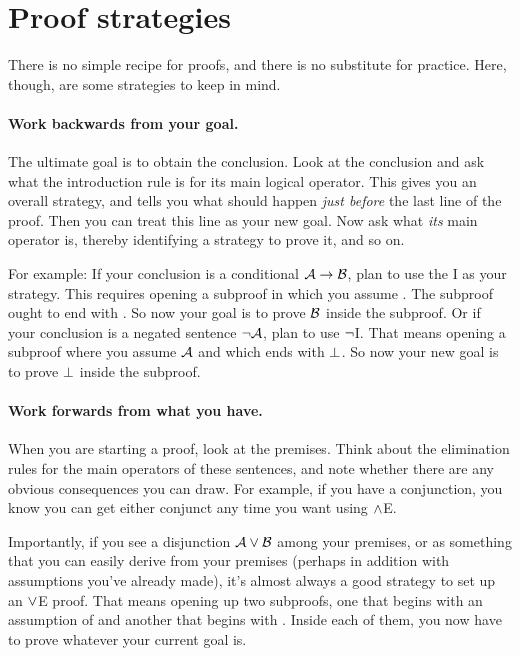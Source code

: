 \section{Proof strategies}\label{s:ProofStrategies}
There is no simple recipe for proofs, and there is no substitute for practice. Here, though, are some strategies to keep in mind.

\paragraph{Work backwards from your goal.}
The ultimate goal is to obtain the conclusion. Look at the conclusion and ask what the introduction rule is for its main logical operator. This gives you an overall strategy, and tells you what should happen \emph{just before} the last line of the proof. Then you can treat this line as your new goal. Now ask what \emph{its} main operator is, thereby identifying a strategy to prove it, and so on.


For example: If your conclusion is a conditional $\mathcal{A}\rightarrow\mathcal{B}$, plan to use the {\eif}I as your strategy. This requires opening a subproof in which you assume . The subproof ought to end with . So now your goal is to prove $\mathcal{B}$ inside the subproof.  Or if your conclusion is a negated sentence $\neg \mathcal{A}$, plan to use $\neg$I.  That means opening a subproof where you assume $\mathcal{A}$ and which ends with $\bot$.  So now your new goal is to prove $\bot$ inside the subproof.

\paragraph{Work forwards from what you have.}
When you are starting a proof, look at the premises.   Think about the elimination rules for the main operators of these sentences, and note whether there are any obvious consequences you can draw.  For example, if you have a conjunction, you know you can get either conjunct any time you want using $\wedge$E.

Importantly, if you see a disjunction $\mathcal{A} \vee \mathcal{B}$ among your premises, or as something that you can easily derive from your premises (perhaps in addition with assumptions you've already made), it's almost always a good strategy to set up an $\vee$E proof.  That means opening up two subproofs, one that begins with an assumption of  and another that begins with .  Inside each of them, you now have to prove whatever your current goal is.

